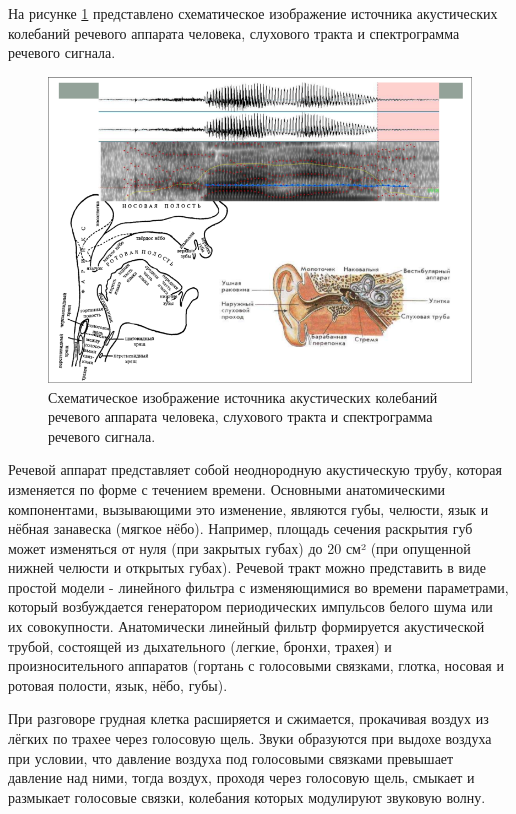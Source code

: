 
На рисунке \ref{fig:fig01} представлено схематическое изображение источника
акустических колебаний речевого аппарата человека, слухового тракта и
спектрограмма речевого сигнала.

\begin{figure}
    \centering
    \includegraphics[scale=0.6]{inc/fig_01.png}
    \caption{
        Схематическое изображение источника акустических колебаний речевого
        аппарата человека, слухового тракта и спектрограмма речевого сигнала.
    }
    \label{fig:fig01}
\end{figure}

Речевой аппарат представляет собой неоднородную акустическую трубу, которая
изменяется по форме с течением   времени. Основными анатомическими
компонентами, вызывающими это изменение, являются губы, челюсти, язык и нёбная
занавеска (мягкое нёбо). Например, площадь сечения раскрытия губ может
изменяться от нуля (при закрытых губах) до 20 см² (при опущенной нижней челюсти
и открытых губах). Речевой тракт можно представить в виде простой модели -
линейного фильтра с изменяющимися во времени параметрами, который возбуждается
генератором периодических импульсов белого шума или их совокупности.
Анатомически линейный фильтр формируется акустической трубой, состоящей из
дыхательного (легкие, бронхи, трахея) и произносительного аппаратов (гортань с
голосовыми связками, глотка, носовая и ротовая полости, язык, нёбо, губы).


При разговоре грудная клетка расширяется и сжимается, прокачивая воздух из
лёгких по трахее через голосовую щель. Звуки образуются при выдохе воздуха при
условии, что давление воздуха под голосовыми связками превышает давление над
ними, тогда воздух, проходя через голосовую щель, смыкает и размыкает голосовые
связки, колебания которых модулируют звуковую волну.


